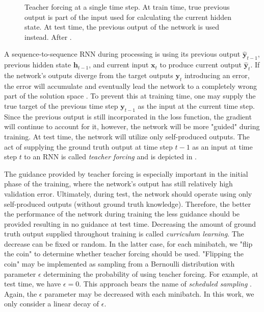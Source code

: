 \begin{figure}
    \centering
    \scalebox{0.6}{}
    \caption{Teacher forcing at a single time step. At train time, true previous output is part of the input used for calculating the current hidden state. At test time, the previous output of the network is used instead. After \cite{Goodfellow-et-al-2016}.}
    \label{fig:teacher_forcing}
\end{figure}

A sequence-to-sequence \ac{RNN} during processing is using its previous output $\hat{\pmb{y}}_{t-1}$, previous hidden state $\pmb{h}_{t-1}$, and current input $\pmb{x}_t$ to produce current output $\hat{\pmb{y}}_t$. If the network's outputs diverge from the target outputs $\pmb{y}_t$ introducing an error, the error will accumulate and eventually lead the network to a completely wrong part of the solution space \cite{Goodfellow-et-al-2016}. To prevent this at training time, one may supply the true target of the previous time step $\pmb{y}_{t-1}$ as the input at the current time step. Since the previous output is still incorporated in the loss function, the gradient will continue to account for it, however, the network will be more "guided" during training. At test time, the network will utilize only self-produced outputs. The act of supplying the ground truth output at time step $t-1$ as an input at time step $t$ to an \ac{RNN} is called \emph{teacher forcing} \cite{Goodfellow-et-al-2016} and is depicted in .

The guidance provided by teacher forcing is especially important in the initial phase of the training, where the network's output has still relatively high validation error. Ultimately, during test, the network should operate using only self-produced outputs (without ground truth knowledge). Therefore, the better the performance of the network during training the less guidance should be provided resulting in no guidance at test time. Decreasing the amount of ground truth output supplied throughout training is called \emph{curriculum learning}. The decrease can be fixed or random. In the latter case, for each minibatch, we "flip the coin" to determine whether teacher forcing should be used. "Flipping the coin" may be implemented as sampling from a Bernoulli distribution with parameter $\epsilon$ determining the probability of using teacher forcing. For example, at test time, we have $\epsilon=0$. This approach bears the name of \emph{scheduled sampling} \cite{Bengio2015}. Again, the $\epsilon$ parameter may be decreased with each minibatch. In this work, we only consider a linear decay of $\epsilon$.

